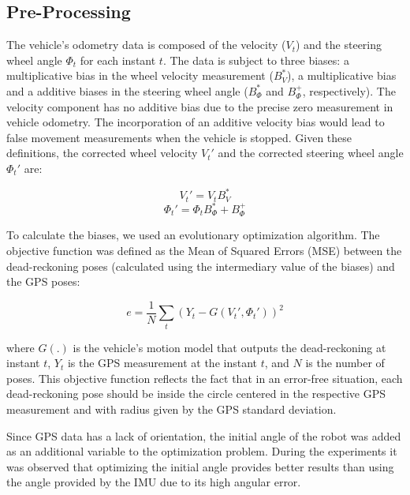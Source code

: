 \subsection{Pre-Processing}

The vehicle's odometry data is composed of the velocity ($V_t$) and the steering wheel angle $\Phi_t$ for each instant $t$. The data is subject to three biases: a multiplicative bias in the wheel velocity measurement ($B_V^*$), a multiplicative bias and a additive biases in the steering wheel angle ($B_\Phi^*$ and $B_\Phi^+$, respectively). The velocity component has no additive bias due to the precise zero measurement in vehicle odometry. The incorporation of an additive velocity bias would lead to false movement measurements when the vehicle is stopped. Given these definitions, the corrected wheel velocity $V_t'$ and the corrected steering wheel angle $\Phi_t'$ are:


\begin{equation}
\label{Eq::velocity}
V_t' = V_t B_V^*
\end{equation}
\begin{equation}
\label{Eq::phi}
\Phi_t' = \Phi_t B_\Phi^* + B_\Phi^+
\end{equation}

To calculate the biases, we used an evolutionary optimization algorithm. The objective function was defined as the Mean of Squared Errors (MSE) between the dead-reckoning poses (calculated using the intermediary value of the biases) and the GPS poses:

\begin{equation}
\label{Eq::MSE}
e = \frac{1}{N}\sum_{t}\left( Y_t-G(V_t', \Phi_t')\right) ^2
\end{equation}

where $G(.)$ is the vehicle's motion model that outputs the dead-reckoning at instant $t$, $Y_t$ is the GPS measurement at the instant $t$, and $N$ is the number of poses. This objective function reflects the fact that in an error-free situation, each dead-reckoning pose should be inside the circle centered in the respective GPS measurement and with radius given by the GPS standard deviation.

Since GPS data has a lack of orientation, the initial angle of the robot was added as an additional variable to the optimization problem. During the experiments it was observed that optimizing the initial angle provides better results than using the angle provided by the IMU due to its high angular error.

